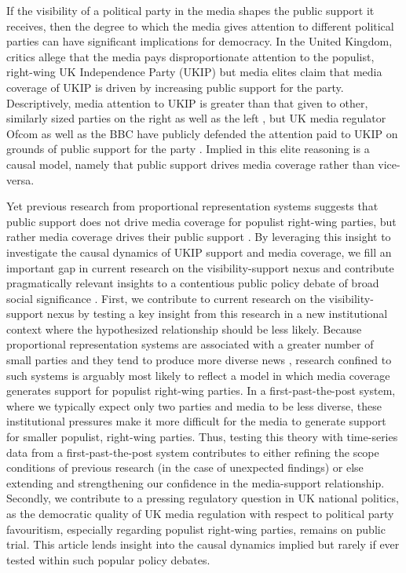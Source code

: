 \documentclass[12pt,]{article}
\begin{document}
If the visibility of a political party in the media shapes the public
support it receives, then the degree to which the media gives attention
to different political parties can have significant implications for
democracy. In the United Kingdom, critics allege that the media pays
disproportionate attention to the populist, right-wing UK Independence
Party (UKIP) but media elites claim that media coverage of UKIP is
driven by increasing public support for the party. Descriptively, media
attention to UKIP is greater than that given to other, similarly sized
parties on the right as well as the left
\citep{Goodwin:03LtHfhh, Stevenson:wo, Soussi:vy}, but UK media
regulator Ofcom as well as the BBC have publicly defended the attention
paid to UKIP on grounds of public support for the party
\citep{Sweeney:wp, Wintour:vf}. Implied in this elite reasoning is a
causal model, namely that public support drives media coverage rather
than vice-versa.

Yet previous research from proportional representation systems suggests
that public support does not drive media coverage for populist
right-wing parties, but rather media coverage drives their public
support
\citep{Boomgaarden:2007ia, Boomgaarden:2009ke, vliegenthart_anti-immigrant_2012}.
By leveraging this insight to investigate the causal dynamics of UKIP
support and media coverage, we fill an important gap in current research
on the visibility-support nexus and contribute pragmatically relevant
insights to a contentious public policy debate of broad social
significance \citep{Gerring:2015ub}. First, we contribute to current
research on the visibility-support nexus by testing a key insight from
this research in a new institutional context where the hypothesized
relationship should be less likely. Because proportional representation
systems are associated with a greater number of small parties
\citep{Duverger:1972wk} and they tend to produce more diverse news
\citep{Benson:2009kb, Sheafer:2009hi, Kumlin:2001iq, Stromback:2006ht, Baum:2012je},
research confined to such systems is arguably most likely to reflect a
model in which media coverage generates support for populist right-wing
parties. In a first-past-the-post system, where we typically expect only
two parties and media to be less diverse, these institutional pressures
make it more difficult for the media to generate support for smaller
populist, right-wing parties. Thus, testing this theory with time-series
data from a first-past-the-post system contributes to either refining
the scope conditions of previous research (in the case of unexpected
findings) or else extending and strengthening our confidence in the
media-support relationship. Secondly, we contribute to a pressing
regulatory question in UK national politics, as the democratic quality
of UK media regulation with respect to political party favouritism,
especially regarding populist right-wing parties, remains on public
trial. This article lends insight into the causal dynamics implied but
rarely if ever tested within such popular policy debates.
\end{document}
